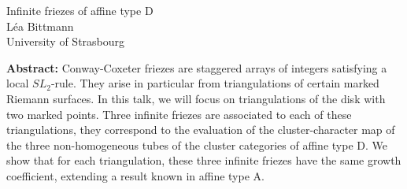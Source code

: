 \documentclass[12pt,a4paper]{article}
\begin{document}
\thispagestyle{empty} 
\begin{center}
{\large  Infinite friezes of affine type D}\\
\vspace*{.5cm}
L\'ea Bittmann\\
University of Strasbourg\\
\end{center}
\vspace*{.8cm}

{\bf Abstract:} Conway-Coxeter friezes are staggered arrays of integers satisfying a local $SL_2$-rule. They arise in particular from triangulations of certain marked Riemann surfaces. In this talk, we will focus on triangulations of the disk with two marked points. Three infinite friezes are associated to each of these triangulations, they correspond to the evaluation of the cluster-character map of the three non-homogeneous tubes of the cluster categories of affine type D. We show that for each triangulation, these three infinite friezes have the same growth coefficient, extending a result known in affine type A.
\end{document}
